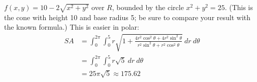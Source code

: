 {$f(x,y) = 10-2\sqrt{x^2+y^2}$ over $R$, bounded by the circle $x^2+y^2=25$. (This is the cone with height 10 and base radius 5; be sure to compare your result with the known formula.)
}
{This is easier in polar:
\begin{align*}SA &= \int_{0}^{2\pi}\int_{0}^{5} r\sqrt{1+ \frac{4r^2\cos^2\theta+4r^2\sin^2\theta}{r^2\sin^2\theta+r^2\cos^2\theta}}\ dr\ d\theta\\
		&= \int_0^{2\pi}\int_0^5r\sqrt{5}\ dr\ d\theta \\
		&= 25\pi\sqrt{5}\approx 175.62
\end{align*}
}
